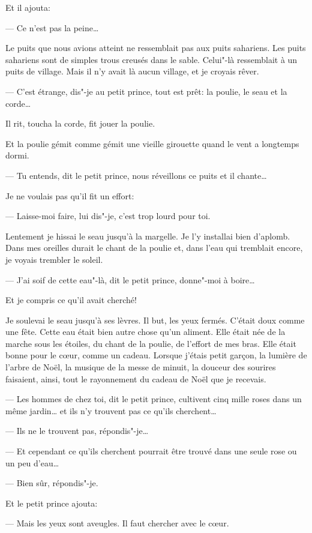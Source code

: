 Et il ajouta:

--- Ce n'est pas la peine\ldots{}

Le puits que nous avions atteint ne ressemblait pas aux puits sahariens. Les puits
sahariens sont de simples trous creusés dans le sable. Celui"-là ressemblait à un
puits de village. Mais il n'y avait là aucun village, et je croyais rêver.

--- C'est étrange, dis"-je au petit prince, tout est prêt: la poulie, le seau et
la corde\ldots{}

Il rit, toucha la corde, fit jouer la poulie.

Et la poulie gémit comme gémit une vieille girouette quand le vent a longtemps dormi.

--- Tu entends, dit le petit prince, nous réveillons ce puits et il chante\ldots{}

Je ne voulais pas qu'il fit un effort:

--- Laisse-moi faire, lui dis"-je, c'est trop lourd pour toi.

Lentement je hissai le seau jusqu'à la margelle. Je l'y installai bien d'aplomb.
Dans mes oreilles durait le chant de la poulie et, dans l'eau qui tremblait encore,
je voyais trembler le soleil.

--- J'ai soif de cette eau"-là, dit le petit prince, donne"-moi à boire\ldots{}

Et je compris ce qu'il avait cherché!

Je soulevai le seau jusqu'à ses lèvres. Il but, les yeux fermés. C'était doux comme
une fête. Cette eau était bien autre chose qu'un aliment. Elle était née de la marche
sous les étoiles, du chant de la poulie, de l'effort de mes bras. Elle était bonne
pour le cœur, comme un cadeau. Lorsque j'étais petit garçon, la lumière de l'arbre
de Noël, la musique de la messe de minuit, la douceur des sourires faisaient, ainsi,
tout le rayonnement du cadeau de Noël que je recevais.

--- Les hommes de chez toi, dit le petit prince, cultivent cinq mille roses dans un
même jardin\ldots{} et ils n'y trouvent pas ce qu'ils cherchent\ldots{}

--- Ils ne le trouvent pas, répondis"-je\ldots{}

--- Et cependant ce qu'ils cherchent pourrait être trouvé dans une seule rose ou un
peu d'eau\ldots{}

--- Bien sûr, répondis"-je.

Et le petit prince ajouta:

--- Mais les yeux sont aveugles. Il faut chercher avec le cœur.

